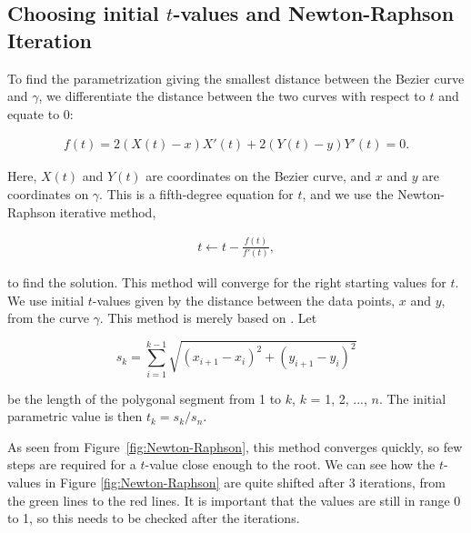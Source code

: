 \documentclass[10pt]{article}
\begin{document}
\subsection*{Choosing initial $t$-values and Newton-Raphson Iteration}

To find the parametrization giving the smallest distance between the Bezier curve and $\gamma$, we differentiate the distance between the two curves with respect to $t$ and equate to 0:

\begin{align}
f(t) =  2(X(t)-x)X'(t) + 2(Y(t)-y)Y'(t) = 0.
\end{align}

Here, $X(t)$ and $Y(t)$ are coordinates on the Bezier curve, and $x$ and $y$ are coordinates on $\gamma$. This is a fifth-degree equation for $t$, and we use the Newton-Raphson iterative method,

\begin{align}
t \gets t - \frac{f(t)}{f'(t)},
\end{align}

to find the solution. This method will converge for the right starting values for $t$. We use initial $t$-values given by the distance between the data points, $x$ and $y$, from the curve $\gamma$. This method is merely based on \cite{Plass:1983}. Let

\begin{equation}
s_k = \sum_{i=1}^{k-1} \sqrt{(x_{i+1}-x_i)^2 + (y_{i+1}-y_i)^2}
\end{equation}

be the length of the polygonal segment from 1 to $k$, $k$ = 1, 2, ..., $n$. The initial parametric value is then $t_k = s_k/s_n$.

As seen from Figure~\ref{fig:Newton-Raphson}, this method converges quickly, so few steps are required for a $t$-value close enough to the root. We can see how the $t$-values in Figure \ref{fig:Newton-Raphson} are quite shifted after 3 iterations, from the green lines to the red lines. It is important that the values are still in range 0 to 1, so this needs to be checked after the iterations. 
\end{document}
